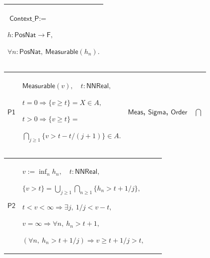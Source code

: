 \documentclass[11pt]{amsart}
\newlength{\FTCOneColumnBody}
\newlength{\FTCFourColumnBody}
\begin{document}
{\par\setlength{\parskip}{0pt}\nointerlineskip
\noindent
\begin{tabular}{|@{}>{\centering\arraybackslash}m{\FTCOneColumnBody}|}\hline
$\displaystyle \textsf{Context\_P}:=$\par
$\displaystyle h:\textsf{PosNat}\to\textsf{F},$\par
$\displaystyle \forall n:\textsf{PosNat},\ \textsf{Measurable}(h_n).$\\ \hline
\end{tabular}%
\par\setlength{\parskip}{0pt}\nointerlineskip
\noindent
\begin{tabular}{|@{}>{\centering\arraybackslash}m{0.078431\FTCFourColumnBody}|>{\centering\arraybackslash}m{0.535947\FTCFourColumnBody}|>{\centering\arraybackslash}m{0.281045\FTCFourColumnBody}|>{\centering\arraybackslash}m{0.104575\FTCFourColumnBody}|}\hline
\hypertarget{proof:P1}{$\displaystyle \textsf{P1}$} & $\displaystyle \textsf{Measurable}(v),\quad t:\textsf{NNReal},$\par
$\displaystyle t=0\Rightarrow\{v\ge t\}=X\in A,$\par
$\displaystyle t>0\Rightarrow\{v\ge t\}=$\par
$\displaystyle \bigcap_{j\ge1}\{v>t-t/(j+1)\}\in A.$ & \hyperlink{def:Meas}{$\displaystyle \textsf{Meas}$}, \hyperlink{ax:Sigma}{$\displaystyle \textsf{Sigma}$}, \hyperlink{ax:Order}{$\displaystyle \textsf{Order}$} & $\displaystyle \bigcap$\\ \hline
\end{tabular}%
\par\setlength{\parskip}{0pt}\nointerlineskip
\noindent
\begin{tabular}{|@{}>{\centering\arraybackslash}m{0.078431\FTCFourColumnBody}|>{\centering\arraybackslash}m{0.535947\FTCFourColumnBody}|>{\centering\arraybackslash}m{0.281045\FTCFourColumnBody}|>{\centering\arraybackslash}m{0.104575\FTCFourColumnBody}|}\hline
\hypertarget{proof:P2}{$\displaystyle \textsf{P2}$} & $\displaystyle v:=\inf_n h_n,\quad t:\textsf{NNReal},$\par
$\displaystyle \{v>t\}=\bigcup_{j\ge1}\bigcap_{n\ge1}\{h_n>t+1/j\},$\par
$\displaystyle t<v<\infty\Rightarrow\exists j,\ 1/j<v-t,$\par
$\displaystyle v=\infty\Rightarrow\forall n,\ h_n>t+1,$\par
$\displaystyle (\forall n,\ h_n>t+1/j)\Rightarrow v\ge t+1/j>t,$\par

\end{tabular}}
\end{document}
